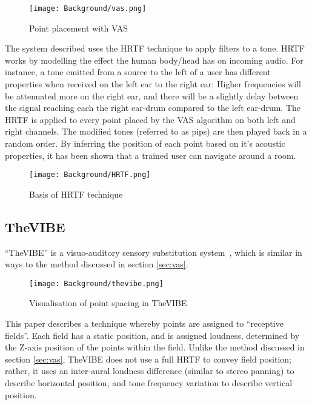 \begin{figure}[H]
    \centering
    \texttt{[image: Background/vas.png]}
    \caption{Point placement with \ac{VAS}}
\end{figure}

The system described uses the \ac{HRTF} technique to apply filters to a tone. \ac{HRTF} works by modelling the effect the human body/head has on incoming audio. For instance, a tone emitted from a source to the left of a user has different properties when received on the left ear to the right ear; Higher frequencies will be attenuated more on the right ear, and there will be a slightly delay between the signal reaching each the right ear-drum compared to the left ear-drum. The \ac{HRTF} is applied to every point placed by the \ac{VAS} algorithm on both left and right channels. The modified tones (referred to as pips) are then played back in a random order. By inferring the position of each point based on it's acoustic properties, it has been shown that a trained user can navigate around a room.

\begin{figure}[H]
    \centering
    \texttt{[image: Background/HRTF.png]}
    \caption{Basis of HRTF technique~\cite{hrtf-diagram}}
\end{figure}

\subsection{TheVIBE}
``TheVIBE'' is a visuo-auditory sensory substitution system~\cite{thevibe}, which is similar in ways to the method discussed in section \ref{sec:vas}.

\begin{figure}[H]
    \centering
    \texttt{[image: Background/thevibe.png]}
    \caption{Visualisation of point spacing in TheVIBE}
\end{figure}

This paper describes a technique whereby points are assigned to ``receptive fields''. Each field has a static position, and is assigned loudness, determined by the Z-axis position of the points within the field. Unlike the method discussed in section \ref{sec:vas}, TheVIBE does not use a full \ac{HRTF} to convey field position; rather, it uses an inter-aural loudness difference (similar to stereo panning) to describe horizontal position, and tone frequency variation to describe vertical position.

